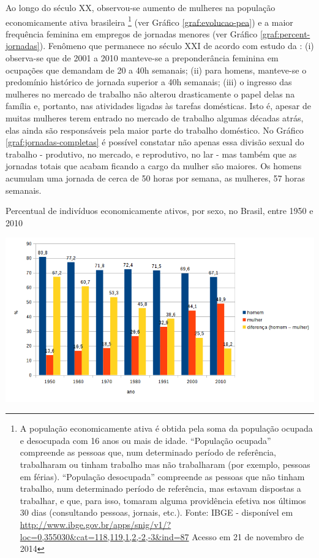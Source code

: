 Ao longo do século XX, observou-se aumento de mulheres na população economicamente ativa brasileira \footnote{A população economicamente ativa é obtida pela soma da população ocupada e desocupada com 16 anos ou mais de idade. ``População ocupada'' compreende as pessoas que, num determinado período de referência, trabalharam ou tinham trabalho mas não trabalharam (por exemplo, pessoas em férias). ``População desocupada'' compreende as pessoas que não tinham trabalho, num determinado período de referência, mas estavam dispostas a trabalhar, e que, para isso, tomaram alguma providência efetiva nos últimos 30 dias (consultando pessoas, jornais, etc.). Fonte: IBGE - disponível em \url{http://www.ibge.gov.br/apps/snig/v1/?loc=0,355030&cat=118,119,1,2,-2,-3&ind=87} Acesso em 21 de novembro de 2014}
 (ver Gráfico \ref{graf:evolucao-pea}) e a maior frequência feminina em empregos de jornadas menores (ver Gráfico \ref{graf:percent-jornadas}). Fenômeno que permanece no século XXI de acordo com estudo da \cite{ABRAMO2010}: (i) observa-se que de 2001 a 2010 manteve-se a preponderância feminina em ocupações que demandam de 20 a 40h semanais; (ii) para homens, manteve-se o predomínio histórico de jornada superior a 40h semanais; (iii) o ingresso das mulheres no mercado de trabalho não alterou drasticamente o papel delas na família e, portanto, nas atividades ligadas às tarefas domésticas. Isto é, apesar de muitas mulheres terem entrado no mercado de trabalho algumas décadas atrás, elas ainda são responsáveis pela maior parte do trabalho doméstico. No Gráfico \ref{graf:jornadas-completas} é possível constatar não apenas essa divisão sexual do trabalho - produtivo, no mercado, e reprodutivo, no lar - mas também que as jornadas totais que acabam ficando a cargo da mulher são maiores. Os homens acumulam uma jornada de cerca de 50 horas por semana, as mulheres, 57 horas semanais.

\begin{grafico}[htb]%
    \caption{\label{graf:evolucao-pea}Percentual de indivíduos economicamente ativos, por sexo, no Brasil, entre 1950 e 2010}%
    \begin{center}%
        \includegraphics[width=1.05\textwidth]{./imagens/evolucao-pea1.png}%
    \end{center}%
\end{grafico}%

